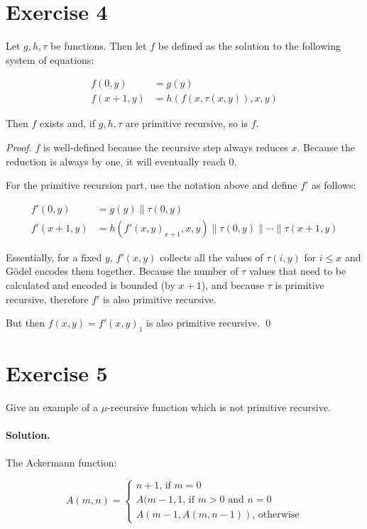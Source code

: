\documentclass[11pt]{llncs}
\begin{document}
\section*{Exercise 4}
\begin{lemma}
  Let $g, h, \tau$ be functions. Then let $f$ be defined as the solution to the
  following system of equations:

  \begin{align*}
    f(0, y) &= g(y)\\
    f(x + 1, y) &= h(f(x, \tau(x, y)), x, y)
  \end{align*}

  Then $f$ exists and, if $g, h, \tau$ are primitive recursive, so is $f$.
\end{lemma}
\begin{proof}
$f$ is well-defined because the recursive step always reduces $x$. Because the
reduction is always by one, it will eventually reach $0$.

For the primitive recursion part, use the notation above and define $f'$ as
follows:

\begin{align*}
  f'(0, y) &= g(y)\|\tau(0, y)\\
  f'(x + 1, y) &= h(f'(x, y)_{x+1}, x, y)\|\tau(0, y)\|\cdots\|\tau(x + 1, y)
\end{align*}

Essentially, for a fixed $y$, $f'(x, y)$ collects all the values of $\tau(i, y)$
for $i \leq x$ and G\"odel encodes them together. Because the number of $\tau$
values that need to be calculated and encoded is bounded (by $x + 1$), and
because $\tau$ is primitive recursive, therefore $f'$ is also primitive
recursive.

But then $f(x, y) = f'(x, y)_1$ is also primitive recursive.
\qed
\end{proof}

\section*{Exercise 5}
Give an example of a $\mu$-recursive function which is not primitive recursive.

\paragraph{Solution.}

The Ackermann function:

\[
  A(m, n) = \begin{cases}
    n + 1 \text{, if } m = 0\\
    A(m - 1, 1 \text{, if } m > 0 \text{ and } n = 0\\
    A(m - 1, A(m, n - 1)) \text{, otherwise}
  \end{cases}
\]
\end{document}
